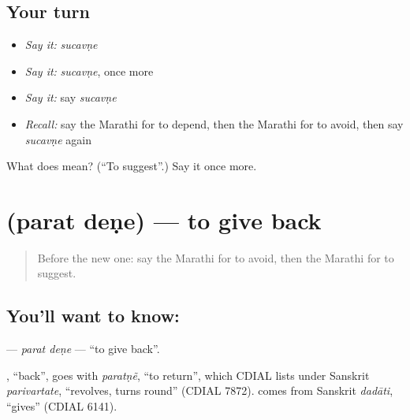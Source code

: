 \subsection*{Your turn}
\begin{itemize}
\raggedright
  \item \emph{Say it:} \emph{sucavṇe}
  \item \emph{Say it:} \emph{sucavṇe}, once more
  \item \emph{Say it:} say \emph{sucavṇe}
  \item \emph{Recall:} say the Marathi for to depend, then the Marathi for to avoid, then say \emph{sucavṇe} again
\end{itemize}

\begin{tcolorbox}[breakable,colback=teal!4,colframe=teal!35!black,title={Before you move on}]
What does  mean? (\textquotedblleft{}To suggest\textquotedblright{}.) Say it once more.
\end{tcolorbox}
\section[\texorpdfstring{\mr{परत} \mr{देणे} (parat deṇe)}{परत देणे (parat deṇe)}]{  (parat deṇe) — to give back}

\label{lesson:MR-C226-parat-dene}



\begin{quote}
Before the new one: say the Marathi for to avoid, then the Marathi for to suggest.
\end{quote}

\subsection*{You'll want to know:  }
\textbf{ } — \emph{parat deṇe} — \textquotedblleft{}to give back\textquotedblright{}.

\begin{cousinweb}
\textbf{}, \textquotedblleft{}back\textquotedblright{}, goes with \emph{paratṇẽ}, \textquotedblleft{}to return\textquotedblright{}, which CDIAL lists under Sanskrit \emph{parivartate}, \textquotedblleft{}revolves, turns round\textquotedblright{} (CDIAL 7872). \textbf{} comes from Sanskrit \emph{dadāti}, \textquotedblleft{}gives\textquotedblright{} (CDIAL 6141).
\end{cousinweb}

